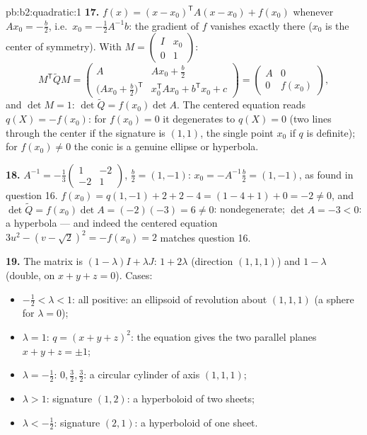 \begin{solution}{pb:b2:quadratic:1}
\textbf{17.} $f(x) = (x - x_0)^{\mathsf T}A(x - x_0) + f(x_0)$
whenever $Ax_0 = -\frac b2$, i.e.\ $x_0 = -\frac12A^{-1}b$: the
gradient of $f$ vanishes exactly there ($x_0$ is the center of
symmetry). With $M = \begin{pmatrix} I & x_0\\ 0 &
1\end{pmatrix}$:
\[
M^{\mathsf T}\widetilde QM
= \begin{pmatrix}
A & Ax_0 + \frac b2\\[2pt]
\bigl(Ax_0 + \frac b2\bigr)^{\mathsf T} &
x_0^{\mathsf T}Ax_0 + b^{\mathsf T}x_0 + c
\end{pmatrix}
= \begin{pmatrix} A & 0\\ 0 & f(x_0)\end{pmatrix},
\]
and $\det M = 1$: $\det\widetilde Q = f(x_0)\det A$. The
centered equation reads $q(X) = -f(x_0)$: for $f(x_0) = 0$ it
degenerates to $q(X) = 0$ (two lines through the center if the
signature is $(1,1)$, the single point $x_0$ if $q$ is
definite); for $f(x_0) \neq 0$ the conic is a genuine ellipse
or hyperbola.

\textbf{18.} $A^{-1} = -\frac13\begin{pmatrix} 1 & -2\\ -2 &
1\end{pmatrix}$, $\frac b2 = (1, -1)$: $x_0 =
-A^{-1}\frac b2 = (1, -1)$, as found in question 16. $f(x_0) =
q(1,-1) + 2 + 2 - 4 = (1 - 4 + 1) + 0 = -2 \neq 0$, and
$\det\widetilde Q = f(x_0)\det A = (-2)(-3) = 6 \neq 0$:
nondegenerate; $\det A = -3 < 0$: a hyperbola --- and indeed
the centered equation $3u^2 - (v - \sqrt2)^2 = -f(x_0) = 2$
matches question 16.

\textbf{19.} The matrix is $(1-\lambda)I + \lambda J$:
 $1 + 2\lambda$ (direction $(1,1,1)$) and $1 -
\lambda$ (double, on $x + y + z = 0$). Cases:
\begin{itemize}
  \item $-\frac12 < \lambda < 1$: all  positive:
        an ellipsoid of revolution about $(1,1,1)$ (a sphere
        for $\lambda = 0$);
  \item $\lambda = 1$: $q = (x+y+z)^2$: the equation gives the
        two parallel planes $x + y + z = \pm1$;
  \item $\lambda = -\frac12$:  $0, \frac32,
        \frac32$: a circular cylinder of axis $(1,1,1)$;
  \item $\lambda > 1$: signature $(1, 2)$: a hyperboloid of
        two sheets;
  \item $\lambda < -\frac12$: signature $(2, 1)$: a
        hyperboloid of one sheet.
\end{itemize}


\end{solution}
